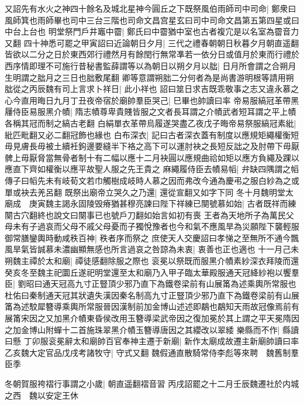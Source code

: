 又詔先有水火之神四十餘名及城北星神今圓丘之下既祭風伯雨師司中司命|{
	鄭衆曰風師箕也雨師畢也司中三台三階也司命文昌宫星玄曰司中司命文昌第五第四星或曰中台上台也}
明堂祭門戶井竈中霤|{
	鄭氏曰中霤猶中室也古者複宂是以名室為霤音力又翻}
四十神悉可罷之甲寅詔曰近論朝日夕月|{
	三代之禮春朝朝日秋暮夕月朝直遥翻}
皆欲以二分之日於東西郊行禮然月有餘閏行無常凖若一依分日或值月於東而行禮於西序情即理不可施行昔秘書監薛謂等以為朝日以朔夕月以朏|{
	日月所會謂之合朔月生明謂之朏月之三日也胐敷尾翻}
卿等意謂朔胐二分何者為是尚書游明根等請用朔朏從之丙辰魏有司上言求卜祥日|{
	此小祥也}
詔曰筮日求吉既乖敬事之志又違永慕之心今直用晦日九月丁丑夜帝宿於廟帥羣臣哭己|{
	巳畢也帥讀曰率}
帝易服縞冠革帶黑屨侍臣易服黑介幘|{
	隋志幘尊卑貴賤皆服之文者長耳謂之介幘武者短耳謂之平上幘各稱其冠而制之縞古老翻}
白絹單衣革帶烏履遂哭盡乙夜戊子晦帝易祭服縞冠素紕|{
	紕匹毗翻又必二翻冠飾也緣也}
白布深衣|{
	記曰古者深衣蓋有制度以應規矩繩權衡短毋見膚長毋被土續衽鉤邊要縫半下袼之高下可以運肘袂之長短反詘之及肘帶下毋厭髀上毋厭脅當無骨者制十有二幅以應十二月袂圓以應規曲祫如矩以應方負繩及踝以應直下齊如權衡以應平故聖人服之先王貴之}
麻繩履侍臣去幘易幍|{
	弁缺四隅謂之幍傳子曰幍先未有岐荀文若巾觸樹成岐時人慕之因而弗改今通為慶弔之服白紗為之或單或袂去羌呂翻}
既祭出廟帝立哭久之乃還|{
	還從宣翻又如字下同}
冬十月魏明堂太廟成　庚寅魏主謁永固陵毁瘠猶甚穆亮諫曰陛下祥練已闋號慕如始|{
	古者既祥而練闋古穴翻終也說文曰闋事已也號戶刀翻如始言如初有喪}
王者為天地所子為萬民父母未有子過哀而父母不戚父母憂而子獨悅豫者也今和氣不應風旱為災願陛下襲輕服御常膳鑾輿時動咸秩百神|{
	秩者序而祭之}
庶使天人交慶詔曰孝悌之至無所不通今飄風旱氣皆誠慕未濃幽顯無感也所言過哀之咎諒為未衷|{
	衷善也正也適也}
十一月己未朔魏主禫於太和廟|{
	禫徒感翻除服之際也}
衮冕以祭既而服黑介幘素紗深衣拜陵而還癸亥冬至魏主祀圜丘遂祀明堂還至太和廟乃入甲子臨太華殿服通天冠絳紗袍以饗羣臣|{
	劉昭曰通天冠高九寸正豎頂少邪乃直下為鐵卷梁前有山展筩為述乘輿所常服也杜佑曰秦制通天冠其狀遺失漢因秦名制高九寸正豎頂少邪乃直下為鐵卷梁前有山展筩為述駮犀簪導乘輿所常服晉因漢制前加金博山述述即鷸也鷸知天雨故冠像焉前有展筩宋因之又加黑介幘東昏侯改用玉簪導梁武帝因之復加冕於其上謂之平天冕隋因之加金博山附蟬十二首施珠翠黑介幘玉簪導唐因之其纓改以翠緌}
樂縣而不作|{
	縣讀曰懸}
丁卯服衮冕辭太和廟帥百官奉神主遷于新廟|{
	新作太廟成故遷主新廟帥讀曰率}
乙亥魏大定官品戊戌考諸牧守|{
	守式又翻}
魏假通直散騎常侍李彪等來聘　魏舊制羣臣季

冬朝賀服袴褶行事謂之小歲|{
	朝直遥翻褶音習}
丙戌詔罷之十二月壬辰魏遷社於内城之西　魏以安定王休

